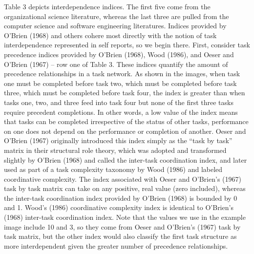 \documentclass[english,,man]{apa6}
\theoremstyle{definition}
\theoremstyle{definition}
\theoremstyle{definition}
\theoremstyle{remark}
\begin{document}
Table 3 depicts interdependence indices. The first five come from the
organizational science literature, whereas the last three are pulled
from the computer science and software engineering literatures. Indices
provided by O'Brien (1968) and others cohere most directly with the
notion of task interdependence represented in self reports, so we begin
there. First, consider task precedence indices provided by O'Brien
(1968), Wood (1986), and Oeser and O'Brien (1967) -- row one of Table 3.
These indices quantify the amount of precedence relationships in a task
network. As shown in the images, when task one must be completed before
task two, which must be completed before task three, which must be
completed before task four, the index is greater than when tasks one,
two, and three feed into task four but none of the first three tasks
require precedent completions. In other words, a low value of the index
means that tasks can be completed irrespective of the status of other
tasks, performance on one does not depend on the performance or
completion of another. Oeser and O'Brien (1967) originally introduced
this index simply as the \enquote{task by task} matrix in their
structural role theory, which was adopted and transformed slightly by
O'Brien (1968) and called the inter-task coordination index, and later
used as part of a task complexity taxonomy by Wood (1986) and labeled
coordinative complexity. The index associated with Oeser and O'Brien's
(1967) task by task matrix can take on any positive, real value (zero
included), whereas the inter-task coordination index provided by O'Brien
(1968) is bounded by 0 and 1. Wood's (1986) coordinative complexity
index is identical to O'Brien's (1968) inter-task coordination index.
Note that the values we use in the example image include 10 and 3, so
they come from Oeser and O'Brien's (1967) task by task matrix, but the
other index would also classify the first task structure as more
interdependent given the greater number of precedence relationships.
\end{document}
